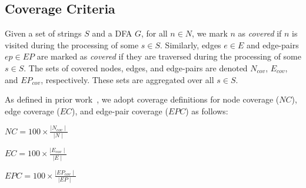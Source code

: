 	
\subsection{Coverage Criteria} 
\label{coveragemetrics}
Given a set of strings $S$ and a DFA $G$, for all $n \in N$, we mark $n$ as \emph{covered} if $n$ is visited during the processing of some $s \in S$. Similarly, edges $e \in E$ and edge-pairs $ep \in EP$ are marked as \emph{covered} if they are traversed during the processing of some $s \in S$. The sets of covered nodes, edges, and edge-pairs are denoted $N_{cov}$, $E_{cov}$, and $EP_{cov}$, respectively. 
These sets are aggregated over all $s \in S$. 

As defined in prior work~\cite{ammann2016introduction}, we adopt coverage definitions for node coverage ($NC$), edge coverage ($EC$), and edge-pair coverage ($EPC$) as follows:  


\begin{definition}
$NC = \displaystyle{100 \times \frac{\mid N_{cov} \mid}{ \mid N \mid}}$
\end{definition}

\begin{definition}
$EC = \displaystyle{100 \times \frac{\mid E_{cov} \mid}{\mid E \mid}}$
\end{definition}

\begin{definition}
$EPC = \displaystyle{100 \times \frac{\mid EP_{cov} \mid}{\mid EP \mid}}$
\end{definition}




